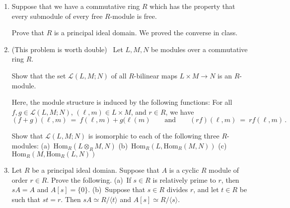 \documentclass[12pt]{article}
\newcommand{\calL}{{\mathcal L}}
\newcommand{\Hom}{\mbox{Hom}}
\def\defcolor#1{{\color{blue}#1}}
\begin{document}
\begin{enumerate}

\item  Suppose that we have a commutative ring $R$ which has the property that every submodule of every free $R$-module is free.
  
       Prove that $R$ is a principal ideal domain.  {\color{blue}We proved the converse in class.}
   \vspace{-2pt}

 \item   {\color{blue}(This problem is worth double)} \ 
   Let $L,M,N$ be modules over a commutative ring $R$.

   Show that the set \defcolor{$\calL(L,M;N)$} of all $R$-bilinear maps $L\times M\to N$ is an $R$-module.

   Here, the module structure is induced by the following functions: 
   For all $f,g\in\calL(L,M;N)$, $(\ell,m)\in L\times M$, and $r\in R$, we have
   \[
   (f+g)(\ell,m)\ =\ f(\ell,m)+g(\ell(m)
   \qquad\mbox{and}\qquad
   (rf)(\ell,m)\ =\ rf(\ell,m)\,.
   \]

   Show that $\calL(L,M;N)$ is isomorphic to each of the following three $R$-modules:\newline
   (a)\ $\Hom_R(L\otimes_R M, N)$\newline
   (b)\ $\Hom_R(L, \Hom_R(M, N))$\newline
   (c)\ $\Hom_R(M,\Hom_R(L, N))$
   
\vspace{-2pt}

\item  Let $R$ be a principal ideal domian.
  Suppose that $A$ is a cyclic $R$ module of order $r\in R$.
  Prove the following.\newline
   (a)\ If $s\in R$ is relatively prime to $r$, then $sA=A$ and $A[s]=\{0\}$.\newline
  (b)\ Suppose that $s\in R$ divides $r$, and let $t\in R$ be such that $st=r$.
        Then
       $sA\simeq R/\langle t\rangle$ and $A[s]\simeq R/\langle s\rangle$.
\vspace{-2pt}


\end{enumerate}
\end{document}
